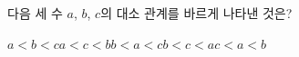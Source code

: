 다음 세 수 $a$, $b$, $c$의 대소 관계를 바르게 나타낸 것은?
\begin{choices32}{$a<b<c$}{$a<c<b$}{$b<a<c$}{$b<c<a$}{$c<a<b$}\end{choices32}
